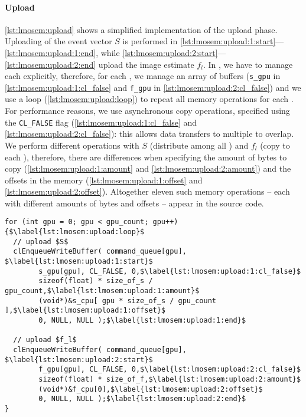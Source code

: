 \paragraph{Upload}
\autoref{lst:lmosem:upload} shows a simplified \OpenCL implementation of the upload phase.
Uploading of the event vector $S$ is performed in \autoref{lst:lmosem:upload:1:start}---\autoref{lst:lmosem:upload:1:end}, while \autoref{lst:lmosem:upload:2:start}---\autoref{lst:lmosem:upload:2:end} upload the image estimate $f_l$.
In \OpenCL, we have to manage each \GPU explicitly, therefore, for each \GPU, we manage an array of buffers (\texttt{s\_gpu} in \autoref{lst:lmosem:upload:1:cl_false} and \texttt{f\_gpu} in \autoref{lst:lmosem:upload:2:cl_false}) and we use a loop (\autoref{lst:lmosem:upload:loop}) to repeat all memory operations for each \GPU.
For performance reasons, we use asynchronous copy operations, specified using the \texttt{CL\_FALSE} flag (\autoref{lst:lmosem:upload:1:cl_false} and \autoref{lst:lmosem:upload:2:cl_false}): this allows data transfers to multiple \GPUs to overlap.
We perform different operations with $S$ (distribute among all \GPUs) and $f_l$ (copy to each \GPU), therefore, there are differences when specifying the amount of bytes to copy (\autoref{lst:lmosem:upload:1:amount} and \autoref{lst:lmosem:upload:2:amount}) and the offsets in the \CPU memory (\autoref{lst:lmosem:upload:1:offset} and \autoref{lst:lmosem:upload:2:offset}).
Altogether eleven such memory operations -- each with different amounts of bytes and offsets -- appear in the \OpenCL source code.

\begin{lstlisting}[float,
  caption={[Implementation of the upload phase of the LM OSEM in \OpenCL.]Implementation of the upload phase in \OpenCL (omitting error checks for brevity).},
  label={lst:lmosem:upload}]
for (int gpu = 0; gpu < gpu_count; gpu++) {$\label{lst:lmosem:upload:loop}$
  // upload $S$
  clEnqueueWriteBuffer( command_queue[gpu], $\label{lst:lmosem:upload:1:start}$
        s_gpu[gpu], CL_FALSE, 0,$\label{lst:lmosem:upload:1:cl_false}$
        sizeof(float) * size_of_s / gpu_count,$\label{lst:lmosem:upload:1:amount}$
        (void*)&s_cpu[ gpu * size_of_s / gpu_count ],$\label{lst:lmosem:upload:1:offset}$
        0, NULL, NULL );$\label{lst:lmosem:upload:1:end}$

  // upload $f_l$
  clEnqueueWriteBuffer( command_queue[gpu], $\label{lst:lmosem:upload:2:start}$
        f_gpu[gpu], CL_FALSE, 0,$\label{lst:lmosem:upload:2:cl_false}$
        sizeof(float) * size_of_f,$\label{lst:lmosem:upload:2:amount}$
        (void*)&f_cpu[0],$\label{lst:lmosem:upload:2:offset}$
        0, NULL, NULL );$\label{lst:lmosem:upload:2:end}$
}
\end{lstlisting}

